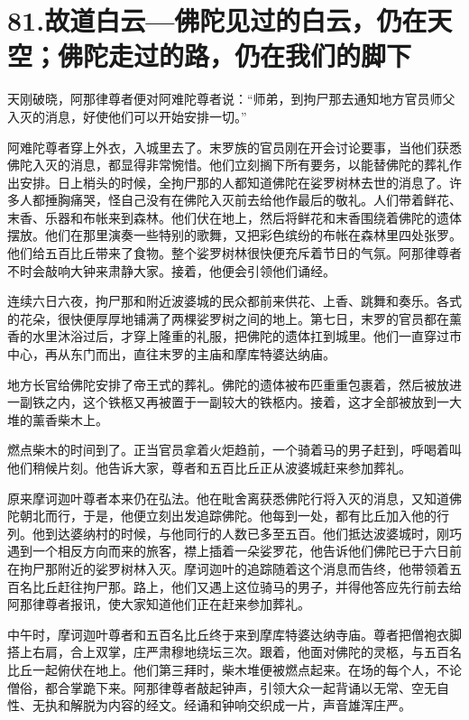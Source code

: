 \documentclass[12pt,twoside,openany]{book}
\begin{document}

\chapter{81.故道白云---佛陀见过的白云，仍在天空；佛陀走过的路，仍在我们的脚下}\label{ch81}

天刚破晓，阿那律尊者便对阿难陀尊者说：“师弟，到拘尸那去通知地方官员师父入灭的消息，好使他们可以开始安排一切。”

阿难陀尊者穿上外衣，入城里去了。末罗族的官员刚在开会讨论要事，当他们获悉佛陀入灭的消息，都显得非常惋惜。他们立刻搁下所有要务，以能替佛陀的葬礼作出安排。日上梢头的时候，全拘尸那的人都知道佛陀在娑罗树林去世的消息了。许多人都捶胸痛哭，怪自己没有在佛陀入灭前去给他作最后的敬礼。人们带着鲜花、末香、乐器和布帐来到森林。他们伏在地上，然后将鲜花和末香围绕着佛陀的遗体摆放。他们在那里演奏一些特别的歌舞，又把彩色缤纷的布帐在森林里四处张罗。他们给五百比丘带来了食物。整个娑罗树林很快便充斥着节日的气氛。阿那律尊者不时会敲响大钟来肃静大家。接着，他便会引领他们诵经。

连续六日六夜，拘尸那和附近波婆城的民众都前来供花、上香、跳舞和奏乐。各式的花朵，很快便厚厚地铺满了两棵娑罗树之间的地上。第七日，末罗的官员都在薰香的水里沐浴过后，才穿上隆重的礼服，把佛陀的遗体扛到城里。他们一直穿过市中心，再从东门而出，直往末罗的主庙和摩库特婆达纳庙。

地方长官给佛陀安排了帝王式的葬礼。佛陀的遗体被布匹重重包裹着，然后被放进一副铁之内，这个铁柩又再被置于一副较大的铁柩内。接着，这才全部被放到一大堆的薰香柴木上。

燃点柴木的时间到了。正当官员拿着火炬趋前，一个骑着马的男子赶到，呼喝着叫他们稍候片刻。他告诉大家，尊者和五百比丘正从波婆城赶来参加葬礼。

原来摩诃迦叶尊者本来仍在弘法。他在毗舍离获悉佛陀行将入灭的消息，又知道佛陀朝北而行，于是，他便立刻出发追踪佛陀。他每到一处，都有比丘加入他的行列。他到达婆纳村的时候，与他同行的人数已多至五百。他们抵达波婆城时，刚巧遇到一个相反方向而来的旅客，襟上插着一朵娑罗花，他告诉他们佛陀已于六日前在拘尸那附近的娑罗树林入灭。摩诃迦叶的追踪随着这个消息而告终，他带领着五百名比丘赶往拘尸那。路上，他们又遇上这位骑马的男子，并得他答应先行前去给阿那律尊者报讯，使大家知道他们正在赶来参加葬礼。

中午时，摩诃迦叶尊者和五百名比丘终于来到摩库特婆达纳寺庙。尊者把僧袍衣脚搭上右肩，合上双掌，庄严肃穆地绕坛三次。跟着，他面对佛陀的灵柩，与五百名比丘一起俯伏在地上。他们第三拜时，柴木堆便被燃点起来。在场的每个人，不论僧俗，都合掌跪下来。阿那律尊者敲起钟声，引领大众一起背诵以无常、空无自性、无执和解脱为内容的经文。经诵和钟响交织成一片，声音雄浑庄严。
\end{document}
